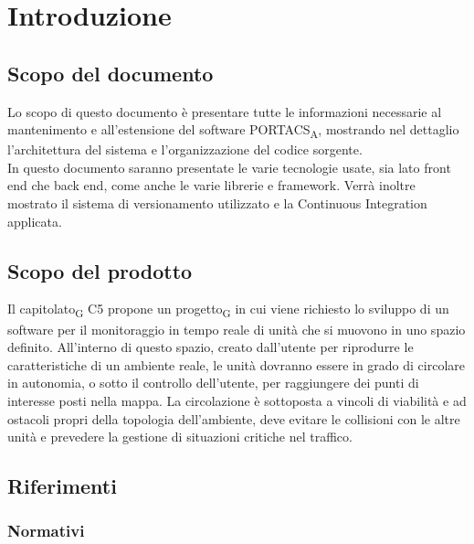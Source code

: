 \section{Introduzione}




\subsection{Scopo del documento}
Lo scopo di questo documento è presentare tutte le informazioni necessarie al mantenimento e all'estensione del software PORTACS\textsubscript{A}, mostrando nel dettaglio l'architettura del sistema e l'organizzazione del codice sorgente.\\
In questo documento saranno presentate le varie tecnologie usate, sia lato front end che back end, come anche le varie librerie e framework. Verrà inoltre mostrato il sistema di versionamento utilizzato e la Continuous Integration applicata.





\subsection{Scopo del prodotto}

Il capitolato\textsubscript{G} C5 propone un progetto\textsubscript{G} in cui viene richiesto lo sviluppo di un software per il monitoraggio in tempo reale di unità che si muovono in uno spazio definito. All'interno di questo spazio, creato dall’utente per riprodurre le caratteristiche di un ambiente reale, le unità dovranno essere in grado di circolare in autonomia, o sotto il controllo dell’utente, per raggiungere dei punti di interesse posti nella mappa.  La circolazione è sottoposta a vincoli di viabilità e ad ostacoli propri della topologia dell’ambiente, deve evitare le collisioni con le altre unità e prevedere la gestione di situazioni critiche nel traffico.




\subsection{Riferimenti}



\subsubsection{Normativi}

